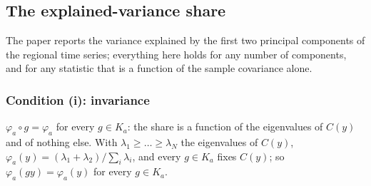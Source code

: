 \documentclass[11pt]{article}
\begin{document}
\subsection{The explained-variance share}
The paper reports the variance explained by the first two principal components of the regional time series; everything here holds for any number of components, and for any statistic that is a function of the sample covariance alone.

\subsubsection{Condition (i): invariance}
$\varphi_a\circ g=\varphi_a$ for every $g\in K_a$: the share is a function of the eigenvalues of $C(y)$ and of nothing else. With $\lambda_1\ge\dots\ge\lambda_N$ the eigenvalues of $C(y)$, $\varphi_a(y)=(\lambda_1+\lambda_2)/\sum_i\lambda_i$, and every $g\in K_a$ fixes $C(y)$; so $\varphi_a(gy)=\varphi_a(y)$ for every $g\in K_a$.
\end{document}
